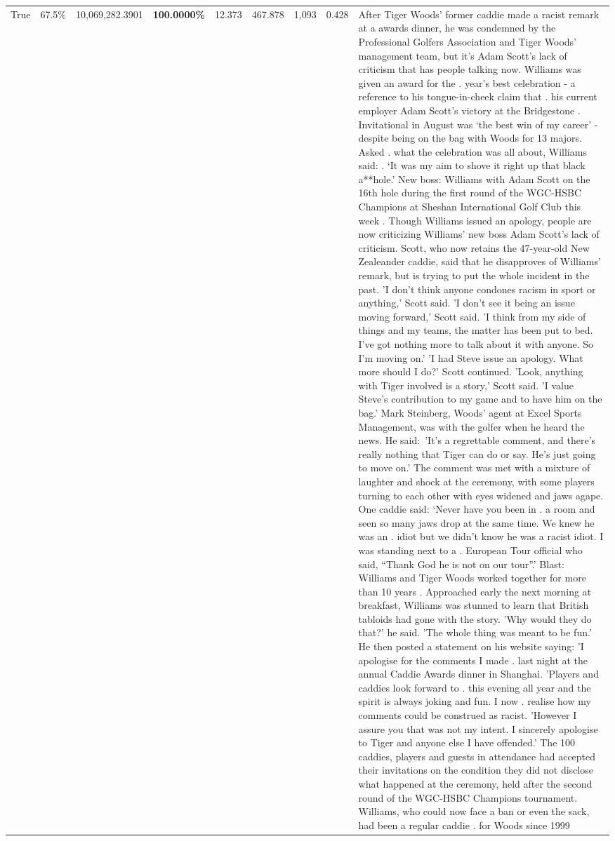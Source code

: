 \begin{table}[H]
\begin{tabular}{lllrlllll}
True & 67.5\% & 10,069,282.3901 & \bfseries \color{red} 100.0000\% & 12.373 & 467.878 & 1,093 & 0.428 & After Tiger Woods' former caddie made a racist remark at a awards dinner, he was condemned by the Professional Golfers Association and Tiger Woods' management team, but it's Adam Scott's lack of criticism that has people talking now. Williams was given an award for the . year’s best celebration - a reference to his tongue-in-cheek claim that . his current employer Adam Scott’s victory at the Bridgestone . Invitational in August was ‘the best win of my career’ - despite being on the bag with Woods for 13 majors. Asked . what the celebration was all about, Williams said: . ‘It was my aim to shove it right up that black a**hole.’ New boss: Williams with Adam Scott  on the 16th hole during the first round of the WGC-HSBC Champions at Sheshan International Golf Club this week . Though Williams issued an apology, people are now criticizing Williams' new boss Adam Scott's lack of criticism. Scott, who now retains the 47-year-old New Zealeander caddie, said that he disapproves of Williams' remark, but is trying to put the whole incident in the past. 'I don't think anyone condones racism in sport or anything,' Scott said. 'I don't see it being an issue moving forward,' Scott said. 'I think from my side of things and my teams, the matter has been put to bed. I've got nothing more to talk about it with anyone. So I'm moving on.' 'I had Steve issue an apology. What more should I do?' Scott continued. 'Look, anything with Tiger involved is a story,' Scott said. 'I value Steve's contribution to my game and to have him on the bag.' Mark Steinberg, Woods' agent at Excel Sports Management, was with the golfer when he heard the news. He said: 'It's a regrettable comment, and there's really nothing that Tiger can do or say. He's just going to move on.' The comment was met with a mixture of laughter and shock at the ceremony, with some players turning to each other with eyes widened and jaws agape. One caddie said: ‘Never have you been in . a room and seen so many jaws drop at the same time. We knew he was an . idiot but we didn’t know he was a racist idiot. I was standing next to a . European Tour official who said, “Thank God he is not on our tour”.’ Blast: Williams and Tiger Woods worked together for more than 10 years . Approached early the next morning at breakfast, Williams was stunned to learn that British tabloids had gone with the story. 'Why would they do that?' he said. 'The whole thing was meant to be fun.' He then posted a statement on his website saying: 'I apologise for the comments I made . last night at the annual Caddie Awards dinner in Shanghai. 'Players and caddies look forward to . this evening all year and the spirit is always joking and fun. I now . realise how my comments could be construed as racist. 'However I assure you that was not my intent. I sincerely apologise to Tiger and anyone else I have offended.' The 100 caddies, players and guests in attendance had accepted their invitations on the condition they did not disclose what happened at the ceremony, held after the second round of the WGC-HSBC Champions tournament. Williams, who could now face a ban or even the sack, had been a regular caddie . for Woods since 1999 
\end{tabular}
\end{table}
